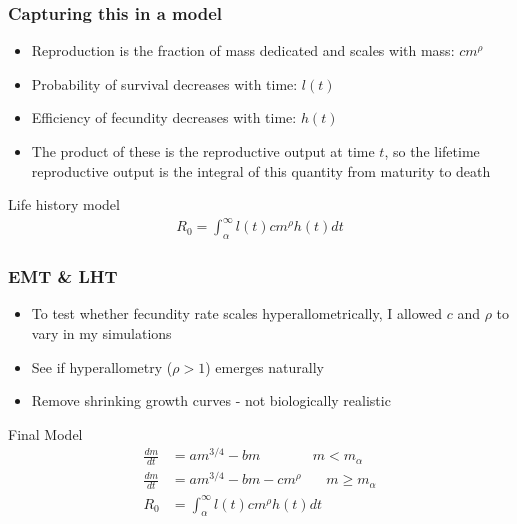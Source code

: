 \documentclass[handout]{beamer}
\begin{document}
\begin{frame}
	\frametitle{Capturing this in a model}
	\begin{itemize}
		\item Reproduction is the fraction of mass dedicated and scales with mass: $cm^{\rho}$
		\item Probability of survival decreases with time: $l(t)$
		\item Efficiency of fecundity decreases with time: $h(t)$
		\item The product of these is the reproductive output at time $t$, so the lifetime reproductive output is the integral of this quantity from maturity to death
	\end{itemize}
	\begin{block}{Life history model}
		\begin{align*}
			R_0 = \int_{\alpha}^{\infty}l(t)cm^{\rho}h(t) dt
		\end{align*}
	\end{block}
\end{frame}

\begin{frame}
	\frametitle{EMT \& LHT}
	\begin{itemize}
		\item To test whether fecundity rate scales hyperallometrically, I allowed $c$ and $\rho$ to vary in my simulations
		\item See if hyperallometry ($\rho > 1$) emerges naturally
		\item Remove shrinking growth curves - not biologically realistic
	\end{itemize}
	\begin{block}{Final Model}
		\begin{align*}
			\frac{dm}{dt} &= am^{3/4} - bm \ \ \ \ \ \ \ \ \ \ \ \ \ \ \ \ \ m < m_{\alpha}\\
			\frac{dm}{dt} &= am^{3/4} - bm - cm^{\rho} \ \ \ \ \  \ \ \ m \geq m_{\alpha}\\
			R_0 &= \int_{\alpha}^{\infty}l(t)cm^{\rho}h(t) dt
		\end{align*}
	\end{block}
\end{frame}
\end{document}
